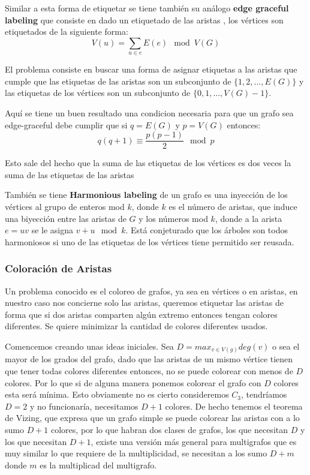 \documentclass[a4paper]{article}
\begin{document}
Similar a esta forma de etiquetar se tiene tambi\'en su an\'alogo \textbf{edge graceful labeling} que consiste en dado un etiquetado de las aristas , los v\'ertices son etiquetados de la siguiente forma:
$$ V(u) = \sum_{u \in e} E(e) \mod V(G)$$

El problema consiste en buscar una forma de asignar etiquetas a las aristas que cumple que las etiquetas de las aristas son un subconjunto de $\{1,2, ..., E(G)\}$ y las etiquetas de los v\'ertices son un subconjunto de $\{0, 1, ..., V(G)-1\}$.

Aqu\'i se tiene un buen resultado una condicion necesaria para que un grafo sea edge-graceful debe cumplir que si $q = E(G)$ y $p = V(G)$ entonces:
$$q(q+1) \equiv \frac{p(p-1)}{2} \mod p$$

Esto sale del hecho que la suma de las etiquetas de los v\'ertices es dos veces la suma de las etiquetas de las aristas 

Tambi\'en se tiene \textbf{Harmonious labeling} de un grafo es una inyecci\'on de los v\'ertices al grupo de enteros mod  $k$, donde $k$ es el n\'umero de aristas, que induce una biyecci\'on entre las aristas de $G$ y los n\'umeros mod $k$, donde a la arista $e=uv$ se le asigna $v+u \mod k$. Est\'a conjeturado que los \'arboles son todos harmoniosos si uno de las etiquetas de los v\'ertices tiene permitido ser reusada.

\subsubsection{Coloraci\'on de Aristas}
 Un problema conocido es el coloreo de grafos, ya sea en v\'ertices o en aristas, en nuestro caso nos concierne solo las aristas, queremos etiquetar las aristas de forma que si dos aristas comparten alg\'un extremo entonces tengan colores diferentes. Se quiere minimizar la cantidad de colores diferentes usados.


 Comencemos creando unas ideas iniciales. Sea $D = max_{v \in V(g)}deg(v)$ o sea el mayor de los grados del grafo, dado que las aristas de un mismo v\'ertice tienen que tener todas colores diferentes entonces, no se puede colorear con menos de $D$ colores. Por lo que si de alguna manera ponemos colorear el grafo con $D$ colores esta ser\'a m\'inima. Esto obviamente no es cierto consideremos $C_3$, tendr\'iamos $D = 2$ y no funcionar\'ia, necesitamos $D+1$ colores. De hecho tenemos el teorema de Vizing, que expresa que un grafo simple se puede colorear las aristas con a lo sumo $D + 1$ colores, por lo que habran dos clases de grafos, los que necesitan $D$ y los que necesitan $D+1$, existe una versi\'on m\'as general para multigrafos que es muy similar lo que requiere de la multiplicidad, se necesitan a los sumo $D + m$ donde $m$ es la multiplicad del multigrafo.
\end{document}
